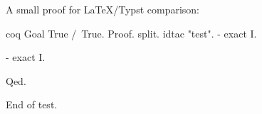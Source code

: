 \documentclass[a4paper,10pt]{article}
\begin{document}
A small proof for LaTeX/Typst comparison:

\begin{alectryon}{coq}{}
Goal True /\ True.
Proof.
  split.
  idtac "test".
  -
      exact I.

  - exact I.


Qed.
\end{alectryon}

End of test.
\end{document}
